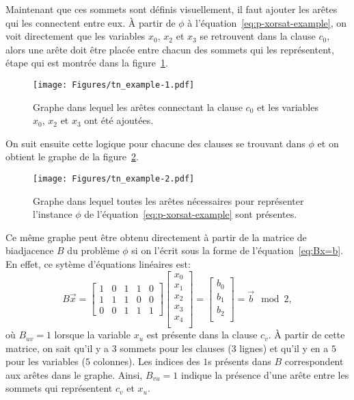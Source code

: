 Maintenant que ces sommets sont définis visuellement, il faut ajouter les arêtes qui les connectent entre eux.
À partir de $\phi$ à l'équation~\ref{eq:p-xorsat-example}, on voit directement que les variables $x_0$, $x_2$ et $x_3$ se retrouvent dans la clause $c_0$, alors une arête doit être placée entre chacun des sommets qui les représentent, étape qui est montrée dans la figure~\ref{fig:tn-example1}.
\begin{figure}[h]
    \centering
    \texttt{[image: Figures/tn\_example-1.pdf]}
    \caption{Graphe dans lequel les arêtes connectant la clause $c_0$ et les variables $x_0$, $x_2$ et $x_3$ ont été ajoutées.}
    \label{fig:tn-example1}
\end{figure}
On suit ensuite cette logique pour chacune des clauses se trouvant dans $\phi$ et on obtient le graphe de la figure~\ref{fig:tn-example2}.
\begin{figure}[h]
    \centering
    \texttt{[image: Figures/tn\_example-2.pdf]}
    \caption{Graphe dans lequel toutes les arêtes nécessaires pour représenter l'instance $\phi$ de l'équation~\ref{eq:p-xorsat-example} sont présentes.}
    \label{fig:tn-example2}
\end{figure}
Ce même graphe peut être obtenu directement à partir de la matrice de biadjacence $B$ du problème $\phi$ si on l'écrit sous la forme de l'équation~\ref{eq:Bx=b}.
En effet, ce sytème d'équations linéaires est:
\begin{equation}
    B\vec{x} = \begin{bmatrix}
        1 & 0 & 1 & 1 & 0 \\
        1 & 1 & 1 & 0 & 0 \\
        0 & 0 & 1 & 1 & 1
    \end{bmatrix}\begin{bmatrix}
        x_0\\
        x_1\\
        x_2\\
        x_3\\
        x_4\\
    \end{bmatrix} = \begin{bmatrix}
        b_0\\
        b_1\\
        b_2\\
    \end{bmatrix} = \vec{b} \mod{2},
\end{equation}
où $B_{uv} = 1$ lorsque la variable $x_u$ est présente dans la clause $c_v$.
À partir de cette matrice, on sait qu'il y a $3$ sommets pour les clauses ($3$ lignes) et qu'il y en a $5$ pour les variables ($5$ colonnes).
Les indices des $1$s présents dans $B$ correspondent aux arêtes dans le graphe.
Ainsi, $B_{vu} = 1$ indique la présence d'une arête entre les sommets qui représentent $c_v$ et $x_u$.

